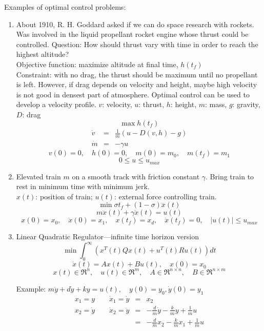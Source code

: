Examples of optimal control problems:
\begin{enumerate}
\item About 1910, R. H. Goddard asked if we can do space research with rockets. Was involved in the liquid propellant rocket engine whose thrust could be controlled. Question: How should thrust vary with time in order to reach the highest altitude?  \\
Objective function:  maximize altitude at final time, $h(t_f)$\\
Constraint:  with no drag, the thrust should be maximum until no propellant is left.  However, if drag depends on velocity and height, maybe high velocity is not good in densest part of atmosphere. Optimal control can be used to develop a velocity profile.
$v$: velocity, $u$: thrust, $h$: height, $m$: mass, $g$: gravity, $D$: drag
$$\max h(t_f)$$
\hspace{1.5in}{\it subject to}
\begin{eqnarray*}
\dot{v}&=&\frac 1m(u - D(v,h) - g)\\
\dot{m}&=&-\gamma u
\end{eqnarray*}
$$
v(0) = 0, \quad h(0) = 0, \quad m(0) = m_0, \quad m(t_f) = m_1$$
$$0\leq u\leq u_{max}$$

\item Elevated train $m$ on a smooth track with friction constant $\gamma$. Bring train to rest in minimum time with minimum jerk.\\
$x(t)$: position of train; $u(t)$: external force controlling train.
$$\min \sigma t_f + (1-\sigma)\dddot x(t)$$
\hspace{1.5in}{\it subject to}
$$ m\ddot x (t) + \gamma \dot x(t) = u(t)$$
$$x(0) = x_0, \quad \dot x (0) = x_1, \quad x(t_f) = x_d, \quad \dot x(t_f) = 0, \quad  |u(t)| \leq u_{max}$$

\item Linear Quadratic Regulator---infinite time horizon version
$$\min \int_0^{\infty} \left(x^T(t)Qx(t) + u^T(t)Ru(t) \right)dt$$
\hspace{1.5in}{\it subject to}
$$\dot x(t) = Ax(t) + Bu(t), \quad x(0) = x_0$$
$$ x(t) \in \Re^n, \quad u(t) \in \Re^m, \quad A\in\Re ^{n\times n}, \quad B\in \Re ^{n\times m}$$

Example:  $m\ddot y + d\dot y + k y = u(t), \quad y(0) = y_0, \dot y(0) = y_1$
\begin{eqnarray*}
 x_1 = y \qquad \dot x_1 = \dot y &=& x_2 \\
 x_2 =\dot y \qquad \dot x_2 = \ddot y &=& -\frac d m \dot y - \frac km y + \frac 1m u\\
 &=& -\frac d m x_2 - \frac km x_1 + \frac 1m u
\end{eqnarray*}


\end{enumerate}
